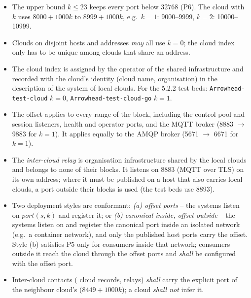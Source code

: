 \begin{itemize}
  \item The upper bound $k \le 23$ keeps every port below 32768 (P6). The cloud with $k$ uses
        $8000+1000k$ to $8999+1000k$, e.g.\ $k=1$: 9000--9999, $k=2$: 10000--10999.
  \item Clouds on disjoint hosts and addresses \emph{may} all use $k=0$; the cloud index only
        has to be unique among clouds that share an address.
  \item The cloud index is assigned by the operator of the shared infrastructure and recorded
        with the cloud's identity (cloud name, organisation) in the description of the system
        of local clouds. For the 5.2.2 test beds: \texttt{Arrowhead-test-cloud} $k=0$,
        \texttt{Arrowhead-test-cloud-go} $k=1$.
  \item The offset applies to every range of the block, including the  control
        pool and session listeners, health and operator ports, and the MQTT broker
        (8883 $\rightarrow$ 9883 for $k=1$). It applies equally to the AMQP broker
        (5671 $\rightarrow$ 6671 for $k=1$).
  \item The \emph{inter-cloud relay} is organisation infrastructure shared by the local clouds and
        belongs to none of their blocks. It listens on 8883 (MQTT over TLS) on its own address;
        where it must be published on a host that also carries local clouds, a port outside their
        blocks is used (the test beds use 8893).
  \item Two deployment styles are conformant:
        \emph{(a) offset ports} -- the systems listen on $\mathit{port}(s,k)$ and register it; or
        \emph{(b) canonical inside, offset outside} -- the systems listen on and register the
        canonical port inside an isolated network (e.g.\ a container network), and only the
        published host ports carry the offset. Style (b) satisfies P5 only for consumers inside
        that network; consumers outside it reach the cloud through the offset ports and
        \emph{shall} be configured with the offset  port.
  \item Inter-cloud contacts ( cloud records, relays) \emph{shall} carry the
        explicit port of the neighbour cloud's 
        ($8449+1000k$); a cloud \emph{shall not} infer it.
\end{itemize}

